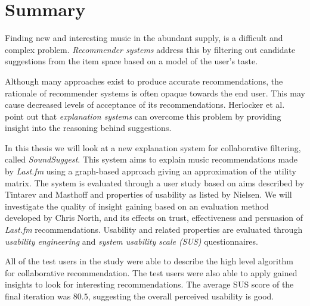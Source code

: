 \chapter*{Summary}\label{chapter:summary:english}


Finding new and interesting music in the abundant supply, is a difficult and complex problem. \emph{Recommender systems} address this by filtering out candidate suggestions from the item space based on a model of the user's taste\cite{song:2012}.

Although many approaches exist to produce accurate recommendations, the rationale of recommender systems is often opaque towards the end user. This may cause decreased levels of acceptance of its recommendations. Herlocker et al. \cite{herlocker:2000} point out that \emph{explanation systems} can overcome this problem by providing insight into the reasoning behind suggestions.

In this thesis we will look at a new explanation system for collaborative filtering, called \emph{SoundSuggest}. This system aims to explain  music recommendations made by \emph{Last.fm} using a graph-based approach giving an approximation of the utility matrix. The system is evaluated through a user study based on aims described by Tintarev and Masthoff\cite{tintarev:2007:SER:1547550.1547664} and properties of usability as listed by Nielsen\cite{nielsen:1993:UE:529793}. We will investigate the quality of insight gaining based on an evaluation method developed by Chris North\cite{north:2006}, and its effects on trust, effectiveness and persuasion of \emph{Last.fm} recommendations. Usability and related properties are evaluated through \emph{usability engineering} and \emph{system usability scale (SUS)} questionnaires.

All of the test users in the study were able to describe the high level algorithm for collaborative recommendation. The test users were also able to apply gained insights to look for interesting recommendations. The average SUS score of the final iteration was $80.5$, suggesting the overall perceived usability is good. %